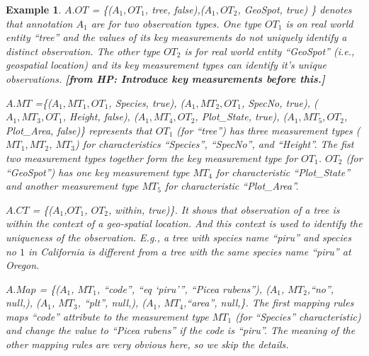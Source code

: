 \documentclass[conference]{IEEEtran}
\newtheorem{example}{Example}[section]
\newcommand{\from}[2]{{\bf[{\sc from #1:} #2]}}
\begin{document}
\begin{example}
$A.OT$ = \{($A_1, OT_1$, tree, false),($A_1, OT_2$, GeoSpot, true) \}
  denotes that annotation $A_1$ are for two observation types. One
  type $OT_1$ is on real world entity ``tree'' and the values of its key measurements
  do not uniquely identify a distinct observation. The other type
  $OT_2$ is for real world entity ``GeoSpot'' (i.e., geospatial
  location) and its key measurement types can identify it's unique
  observations. \from{HP}{Introduce key measurements before this.}

$A.MT$ =\{($A_1, MT_1, OT_1$, Species, true), 
($A_1, MT_2, OT_1$, SpecNo, true), 
($A_1, MT_3, OT_1$, Height, false),
($A_1, MT_4, OT_2$, Plot\_State, true), 
($A_1, MT_5, OT_2$, Plot\_Area, false)\} represents that $OT_1$
(for ``tree'') has three measurement types ($MT_1, MT_2$, $MT_3$) for characteristics
``Species'', ``SpecNo'', and ``Height''. The fist two measurement
  types together form the key measurement type for $OT_1$. 
$OT_2$ (for ``GeoSpot'') has one key measurement type $MT_4$ for
  characteristic ``Plot\_State'' and another measurement type $MT_5$
  for characteristic ``Plot\_Area''. 

$A.CT$ = \{($A_1$,$OT_1$, $OT_2$, within, true)\}. It shows that
observation of a {\em tree} is within the context of a geo-spatial
location. And this context is used to identify the uniqueness of the
observation. E.g., a tree with species name ``piru'' and species no
$1$ in California
is different from a tree with 
the same species name ``piru'' at Oregon. 


$A.Map$ = \{($A_1$, $MT_1$, ``code'', ``eq `piru''', ``Picea rubens''),
($A_1$, $MT_2$,``no'', null,), 
($A_1$, $MT_3$, ``plt'', null,), 
($A_1$, $MT_4$,``area'', null,\}. 
The first mapping rules maps ``code''
attribute to the measurement type $MT_1$ (for ``Species''
characteristic) and change the value to ``Picea rubens'' if the code
is ``piru''. The meaning of the other mapping rules are very
obvious here, so we skip the details. 
\end{example}
\end{document}
